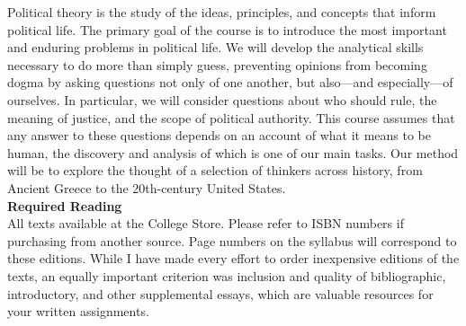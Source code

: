 \documentclass [11pt]{article}
\begin{document}
   Political theory is the study of the ideas, principles, and concepts that inform political life. The primary goal of the course is to introduce the most important and enduring problems in political life. We will develop the analytical skills necessary to do more than simply guess, preventing opinions from becoming dogma by asking questions not only of one another, but also---and especially---of ourselves. In particular, we will consider questions about who should rule, the meaning of justice, and the scope of political authority. This course assumes that any answer to these questions depends on an account of what it means to be human, the discovery and analysis of which is one of our main tasks. Our method will be to explore the thought of a selection of thinkers across history, from Ancient Greece to the 20th-century United States. \\


   {\bf Required Reading}\\

All texts available at the College Store. Please refer to ISBN numbers if purchasing from another source. Page numbers on the syllabus will correspond to these editions. While I have made every effort to order inexpensive editions of the texts, an equally important criterion was inclusion and quality of bibliographic, introductory, and other supplemental essays, which are valuable resources for your written assignments. \\
\end{document}
